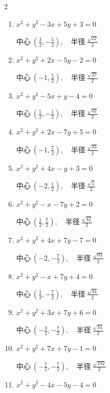 \begin{multicols}{2}
\begin{enumerate}
  \item $x^{2}+y^{2}-3x+5y+3=0$

        $\displaystyle 中心\: \left(\frac{3}{2},-\frac{5}{2}\right), \quad 半径 \ \frac{\sqrt{22}}{2}$

  \item $x^{2}+y^{2}+2x-5y-2=0$

        $\displaystyle 中心\: \left(-1,\frac{5}{2}\right), \quad 半径 \ \frac{\sqrt{37}}{2}$

  \item $x^{2}+y^{2}-5x+y-4=0$

        $\displaystyle 中心\: \left(\frac{5}{2},-\frac{1}{2}\right), \quad 半径 \ \frac{\sqrt{42}}{2}$

  \item $x^{2}+y^{2}+2x-7y+5=0$

        $\displaystyle 中心\: \left(-1,\frac{7}{2}\right), \quad 半径 \ \frac{\sqrt{33}}{2}$

  \item $x^{2}+y^{2}+4x-y+3=0$

        $\displaystyle 中心\: \left(-2,\frac{1}{2}\right), \quad 半径 \ \frac{\sqrt{5}}{2}$

  \item $x^{2}+y^{2}-x-7y+2=0$

        $\displaystyle 中心\: \left(\frac{1}{2},\frac{7}{2}\right), \quad 半径 \ \frac{\sqrt{42}}{2}$

\columnbreak %

  \item $x^{2}+y^{2}+4x+7y-7=0$

        $\displaystyle 中心\: \left(-2,-\frac{7}{2}\right), \quad 半径 \ \frac{\sqrt{93}}{2}$

  \item $x^{2}+y^{2}-x+7y+4=0$

        $\displaystyle 中心\: \left(\frac{1}{2},-\frac{7}{2}\right), \quad 半径 \ \frac{\sqrt{34}}{2}$

  \item $x^{2}+y^{2}+3x+7y+6=0$

        $\displaystyle 中心\: \left(-\frac{3}{2},-\frac{7}{2}\right), \quad 半径 \ \frac{\sqrt{34}}{2}$

  \item $x^{2}+y^{2}+7x+7y-1=0$

        $\displaystyle 中心\: \left(-\frac{7}{2},-\frac{7}{2}\right), \quad 半径 \ \frac{\sqrt{102}}{2}$

  \item $x^{2}+y^{2}-4x-5y-4=0$


\end{enumerate}
\end{multicols}
